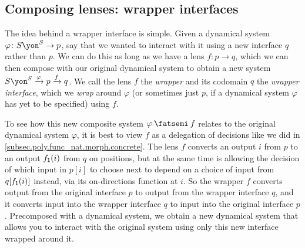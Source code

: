 \documentclass[Book-Poly]{subfiles}
\begin{document}
\subsection{Composing lenses: wrapper interfaces}\label{subsec.poly.dyn_sys.new.wrap}

The idea behind a wrapper interface is simple.
Given a dynamical system $\varphi\colon S\yon^S\to p$, say that we wanted to interact with it using a new interface $q$ rather than $p$.
We can do this as long as we have a lens $f\colon p\to q$, which we can then compose with our original dynamical system to obtain a new system $S\yon^S\To{\varphi}p\To{f}q$.
We call the lens $f$ the \emph{wrapper} and its codomain $q$ the \emph{wrapper interface}, which we \emph{wrap} around $\varphi$ (or sometimes just $p$, if a dynamical system $\varphi$ has yet to be specified) using $f$.

To see how this new composite system $\varphi\then f$ relates to the original dynamical system $\varphi$, it is best to view $f$ as a delegation of decisions like we did in \cref{subsec.poly.func_nat.morph.concrete}.
The lens $f$ converts an output $i$ from $p$ to an output $f_{\textsf{1}}(i)$ from $q$ on positions, but at the same time is allowing the decision of which input in $p[i]$ to choose next to depend on a choice of input from $q[f_{\textsf{1}}(i)]$ instead, via its on-directions function at $i$.
So the wrapper $f$ converts output from the original interface $p$ to output from the wrapper interface $q$, and it converts input into the wrapper interface $q$ to input into the original interface $p$.
Precomposed with a dynamical system, we obtain a new dynamical system that allows you to interact with the original system using only this new interface wrapped around it.
\end{document}
